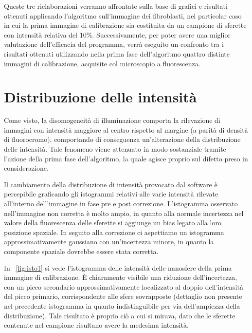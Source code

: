 Queste tre rielaborazioni verranno affrontate sulla base di grafici e risultati ottenuti applicando l'algoritmo sull'immagine dei fibroblasti, nel particolar caso in cui la prima immagine di calibrazione sia costituita da un campione di sferette con intensità relativa del 10\%.
Successivamente, per poter avere una miglior valutazione dell'efficacia del programma, verrà eseguito un confronto tra i risultati ottenuti utilizzando nella prima fase dell'algoritmo quattro distinte immagini di calibrazione, acquisite col microscopio a fluorescenza.


\section{Distribuzione delle intensità}

Come visto, la disomogeneità di illuminazione comporta la rilevazione di immagini con intensità maggiore al centro rispetto al margine (a parità di densità di fluorocromo), comportando di conseguenza un'alterazione della distribuzione delle intensità. 
Tale fenomeno viene attenuato in modo sostanziale tramite l'azione della prima fase dell'algoritmo, la quale agisce proprio sul difetto preso in considerazione.

Il cambiamento della distribuzione di intensità provocato dal software è percepibile graficando gli istogrammi relativi alle varie intensità rilevate all'interno dell'immagine in fase pre e post correzione.
L'istogramma osservato nell'immagine non corretta è molto ampio, in quanto alla normale incertezza nel valore della fluorescenza delle sferette si aggiunge un bias legato alla loro posizione spaziale.
In seguito alla correzione ci aspettiamo un istogramma approssimativamente gaussiano con un'incertezza minore, in quanto la componente spaziale dovrebbe essere stata corretta.

In \figurename~\ref{fig:isto1} si vede l'istogramma delle intensità delle nanosfere della prima immagine di calibrazione.
È chiaramente visibile una riduzione dell'incertezza, con un picco secondario approssimativamente localizzato al doppio dell'intensità del picco primario, corrispondente alle sfere sovrapposte (dettaglio non presente nel precedente istogramma in quanto indistinguibile per via dell'ampiezza della distribuzione).
Tale risultato è proprio ciò a cui si mirava, dato che le sferette contenute nel campione risultano avere la medesima intensità.

